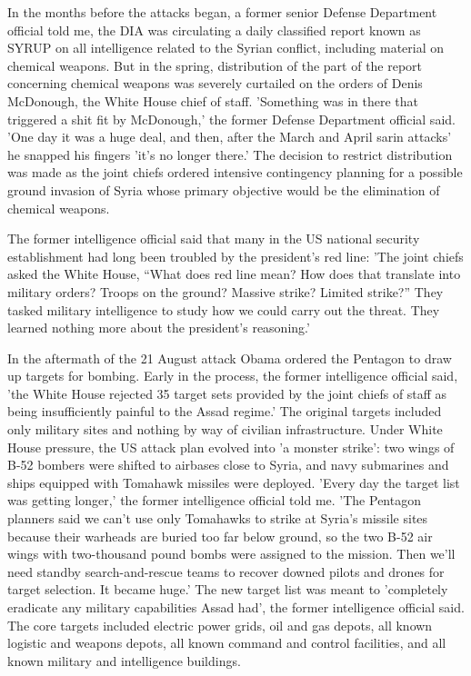 In the months before the attacks began, a former senior Defense Department
official told me, the DIA was circulating a daily classified report
known as SYRUP on all intelligence related to the Syrian conflict,
including material on chemical weapons. But in the spring, distribution
of the part of the report concerning chemical weapons was severely
curtailed on the orders of Denis McDonough, the White House chief
of staff. 'Something was in there that triggered a shit fit by McDonough,'
the former Defense Department official said. 'One day it was a huge
deal, and then, after the March and April sarin attacks' \textendash{}
he snapped his fingers \textendash{} 'it's no longer there.' The decision
to restrict distribution was made as the joint chiefs ordered intensive
contingency planning for a possible ground invasion of Syria whose
primary objective would be the elimination of chemical weapons.

The former intelligence official said that many in the US national
security establishment had long been troubled by the president's red
line: 'The joint chiefs asked the White House, ``What does red line
mean? How does that translate into military orders? Troops on the
ground? Massive strike? Limited strike?'' They tasked military intelligence
to study how we could carry out the threat. They learned nothing more
about the president's reasoning.'

In the aftermath of the 21 August attack Obama ordered the Pentagon
to draw up targets for bombing. Early in the process, the former intelligence
official said, 'the White House rejected 35 target sets provided by
the joint chiefs of staff as being insufficiently \textquotedbl{}painful\textquotedbl{}
to the Assad regime.' The original targets included only military
sites and nothing by way of civilian infrastructure. Under White House
pressure, the US attack plan evolved into 'a monster strike': two
wings of B-52 bombers were shifted to airbases close to Syria, and
navy submarines and ships equipped with Tomahawk missiles were deployed.
'Every day the target list was getting longer,' the former intelligence
official told me. 'The Pentagon planners said we can't use only Tomahawks
to strike at Syria's missile sites because their warheads are buried
too far below ground, so the two B-52 air wings with two-thousand
pound bombs were assigned to the mission. Then we'll need standby
search-and-rescue teams to recover downed pilots and drones for target
selection. It became huge.' The new target list was meant to 'completely
eradicate any military capabilities Assad had', the former intelligence
official said. The core targets included electric power grids, oil
and gas depots, all known logistic and weapons depots, all known command
and control facilities, and all known military and intelligence buildings.

